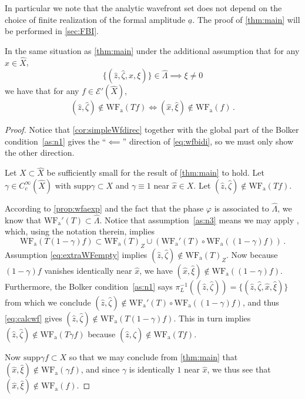 \documentclass[
	fontsize=11pt, 
	twoside=false, 
	abstract=true, 
	a4paper,
]{scrartcl}
\newcommand{\sem}{\setminus\{0\}}
\newcommand{\abs}[1]{\left\lvert#1\right\rvert}
\newcommand{\supp}{\mathrm{supp}}
\newcommand{\wf}{\mathrm{WF}_{\mathrm{a}}}
\newcommand{\ud}[1]{\underline{#1}}
\begin{document}
In particular we note that the analytic wavefront set does not depend on the choice of finite realization of the formal amplitude $\ud{a}$. %
The proof of \cref{thm:main} will be performed in \cref{sec:FBI}.

\begin{corollary}\label{cor:globmain}
	In the same situation as \cref{thm:main} under the additional assumption that for any $x\in \hat X$,
	\begin{equation}\label{eq:extraWFempty}
		\{(\hat z, \hat \zeta, x, \xi)\} \in \hat\Lambda\implies \xi \neq 0%
	\end{equation}
	we have that for any $f\in \mathcal{E}'(\hat X)$, 
	\begin{equation}\label{eq:wfbidi}
		(\hat z, \hat \zeta) \not\in \wf(Tf) \iff (\hat x, \hat \xi) \not\in \wf(f)\,.
	\end{equation}
\end{corollary}
\begin{proof}
	Notice that \cref{cor:simpleWfdirec} together with the global part of the Bolker condition~\ref{as:n1} gives the ``$\impliedby$'' direction of \cref{eq:wfbidi}, so we must only show the other direction.

	Let $X\subset \hat X$ be sufficiently small for the result of \cref{thm:main} to hold. Let $\gamma \in C_c^\infty(\hat X)$ with $\supp\gamma \subset X$ and $\gamma \equiv 1$ near $\hat x\in X$. Let $(\hat z, \hat \zeta) \not\in \wf(Tf)$.

	According to \cref{prop:wfaexp} and the fact that the phase $\varphi$ is associated to $\hat\Lambda$, we know that $\wf'(T) \subset \hat\Lambda$. Notice that assumption~\ref{as:n3} means we may apply \cite[Thm.~8.5.5]{hoermander1}, which, using the notation therein, implies
	\begin{equation}\label{eq:calcwf}
		\wf(T(1-\gamma)f) \subset \wf(T)_Z \cup (\wf'(T)\circ \wf((1-\gamma)f))\,.
	\end{equation}
	Assumption \cref{eq:extraWFempty} implies $(\hat z, \hat \zeta) \not\in \wf(T)_Z$. Now because $(1-\gamma)f$ vanishes identically near $\hat x$, we have $(\hat x, \hat \xi) \not \in \wf((1-\gamma)f)$. Furthermore, the Bolker condition~\ref{as:n1} says $\pi_L^{-1}((\hat z,\hat \zeta)) = \{(\hat z,\hat \zeta, \hat x, \hat \xi)\}$ from which we conclude $(\hat z, \hat \zeta) \not \in \wf'(T)\circ \wf((1-\gamma)f)$, and thus \cref{eq:calcwf} gives $(\hat z, \hat \zeta) \not\in \wf(T(1-\gamma)f)$. This in turn implies $(\hat z, \hat \zeta)\not\in \wf(T\gamma f)$ because $(\hat z, \hat \zeta) \not\in \wf(Tf)$. %

	Now $\supp \gamma f \subset X$ so that we may conclude from \cref{thm:main} that $(\hat x, \hat \xi) \not\in \wf(\gamma f)$, and since $\gamma$ is identically $1$ near $\hat x$, we thus see that $(\hat x,\hat \xi) \not\in \wf(f)$.
\end{proof}
\end{document}
